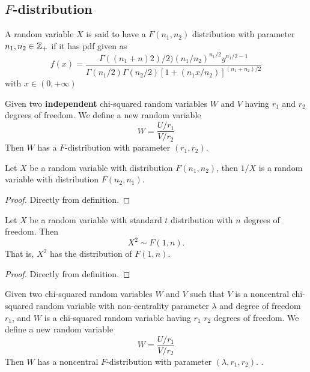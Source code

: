 \begin{refsection}
\subsection{ $F$-distribution}
\begin{definition}[$F$ distribution]\cite[192]{hoggintroduction}
	A random variable $X$ is said to have a $F(n_1,n_2)$ distribution with parameter $n_1,n_2\in \mathbb{Z}_+$ if it has pdf given as
	$$f(x) = \frac{\Gamma((n_1+n)2)/2)(n_1/n_2)^{n_1/2}y^{n_1/2 - 1}}{\Gamma(n_1/2)\Gamma(n_2/2)[1+(n_1x/n_2)]^{(n_1+n_2)/2}}$$
	with $x\in (0,+\infty)$	
\end{definition}


\begin{definition}[alternative]
Given two \textbf{independent} chi-squared random variables $W$ and $V$ having $r_1$ and $r_2$ degrees of freedom. We define a new random variable $$W=\frac{U/r_1}{V/r_2}$$
Then $W$ has a $F$-distribution with parameter $(r_1,r_2)$.	
\end{definition}

\begin{lemma}
Let $X$ be a random variable with distribution $F(n_1,n_2)$, then $1/X$ is a random variable with distribution $F(n_2,n_1)$.	
\end{lemma}
\begin{proof}
	Directly from definition.
\end{proof}


\begin{lemma}
	Let $X$ be a random variable with standard $t$ distribution with $n$ degrees of freedom. Then
	$$X^2 \sim F(1,n).$$
	That is, $X^2$ has the distribution of $F(1,n)$.
\end{lemma}
\begin{proof}
	Directly from definition.
\end{proof}



\begin{definition} Given two chi-squared random variables $W$ and $V$ such that $V$ is a noncentral chi-squared random variable with non-centrality parameter $\lambda$ and degree of freedom $r_1$, and $W$ is a chi-squared random variable having $r_1$ $r_2$ degrees of freedom. We define a new random variable $$W=\frac{U/r_1}{V/r_2}$$
	Then $W$ has a noncentral $F$-distribution  with parameter $(\lambda, r_1,r_2)$.	.
\end{definition}


\end{refsection}
